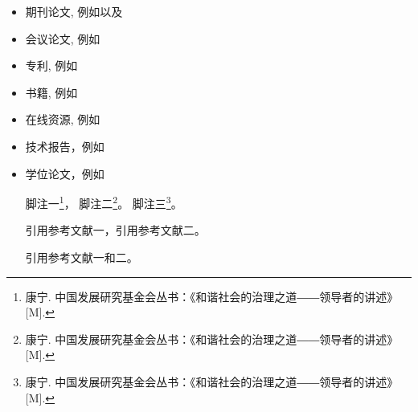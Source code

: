 \begin{itemize}
\item[\ding{172}] 期刊论文, 例如\cite{XmDeng2007,Brown1984,ZHY2017RS,ZHY2012manifold}以及\cite{Wing2006CT}
\item[\ding{173}] 会议论文, 例如\cite{Geyer1999,Branislav2004}
\item[\ding{174}] 专利, 例如\cite{LongMA2015P}
\item[\ding{175}] 书籍, 例如\cite{CDIO2014,ZHY2022}
\item[\ding{176}] 在线资源, 例如\cite{SFMedu,OpenMVS,HainnuThesis}
\item[\ding{177}] 技术报告，例如\cite{Sussman2005}
\item[\ding{178}] 学位论文，例如\cite{ZHY2002,Xue2006,lzj-zhy-MS-thesis-2018,zls-zhy-MS-thesis-2016,zhy-2011-disertation}


脚注一\footnote{康宁. 中国发展研究基金会丛书：《和谐社会的治理之道――领导者的讲述》[M].}，
脚注二\footnote{康宁. 中国发展研究基金会丛书：《和谐社会的治理之道――领导者的讲述》[M].}。
脚注三\footnote{康宁. 中国发展研究基金会丛书：《和谐社会的治理之道――领导者的讲述》[M].}。

引用参考文献一\cite{gao1987}，引用参考文献二\cite{zhang1989}。

引用参考文献一和二\cite{gao1987,zhang1989}。


\end{itemize}
